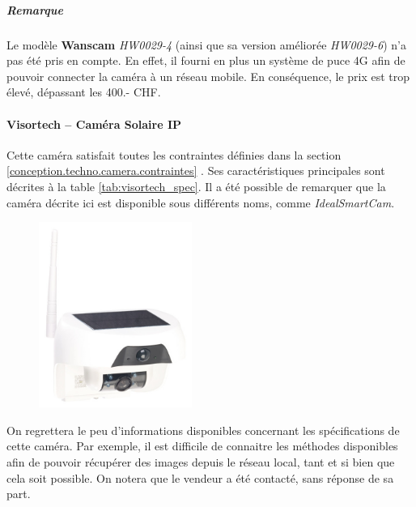 \subparagraph{Remarque} Le modèle \textbf{Wanscam} \textit{HW0029-4} (ainsi que sa version améliorée \textit{HW0029-6}) n'a pas été pris en compte. En effet, il fourni en plus un système de puce 4G afin de pouvoir connecter la caméra à un réseau mobile. En conséquence, le prix est trop élevé, dépassant les 400.- CHF.

\paragraph{\textbf{Visortech} -- Caméra Solaire IP}
Cette caméra satisfait toutes les contraintes définies dans la section \ref{conception.techno.camera.contraintes} . Ses caractéristiques principales sont décrites à la table \ref{tab:visortech_spec}. Il a été possible de remarquer que la caméra décrite ici est disponible sous différents noms, comme \textit{IdealSmartCam}.

\begin{figure}[ht]
    \includegraphics[width=50mm]{img/conception/visortech_cam.jpg}
    \centering
\end{figure}

On regrettera le peu d'informations disponibles concernant les spécifications de cette caméra. Par exemple, il est difficile de connaitre les méthodes disponibles afin de pouvoir récupérer des images depuis le réseau local, tant et si bien que cela soit possible. On notera que le vendeur a été contacté, sans réponse de sa part.

